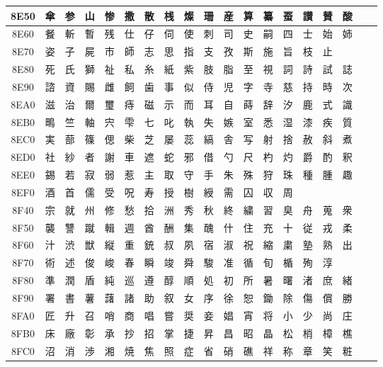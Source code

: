 \begin{table}[H]
\begin{tabular}{|Sc|*{16}{>{\centering\arraybackslash}p{1em}|}>{\centering\arraybackslash}p{2.5em}|}
8E50 & 傘 & 参 & 山 & 惨 & 撒 & 散 & 桟 & 燦 & 珊 & 産 & 算 & 纂 & 蚕 & 讃 & 賛 & 酸 \\ \hline
8E60 & 餐 & 斬 & 暫 & 残 & 仕 & 仔 & 伺 & 使 & 刺 & 司 & 史 & 嗣 & 四 & 士 & 始 & 姉 \\ \hline
8E70 & 姿 & 子 & 屍 & 市 & 師 & 志 & 思 & 指 & 支 & 孜 & 斯 & 施 & 旨 & 枝 & 止 & \\ \hline
8E80 & 死 & 氏 & 獅 & 祉 & 私 & 糸 & 紙 & 紫 & 肢 & 脂 & 至 & 視 & 詞 & 詩 & 試 & 誌 \\ \hline
8E90 & 諮 & 資 & 賜 & 雌 & 飼 & 歯 & 事 & 似 & 侍 & 児 & 字 & 寺 & 慈 & 持 & 時 & 次 \\ \hline
8EA0 & 滋 & 治 & 爾 & 璽 & 痔 & 磁 & 示 & 而 & 耳 & 自 & 蒔 & 辞 & 汐 & 鹿 & 式 & 識 \\ \hline
8EB0 & 鴫 & 竺 & 軸 & 宍 & 雫 & 七 & 叱 & 執 & 失 & 嫉 & 室 & 悉 & 湿 & 漆 & 疾 & 質 \\ \hline
8EC0 & 実 & 蔀 & 篠 & 偲 & 柴 & 芝 & 屡 & 蕊 & 縞 & 舎 & 写 & 射 & 捨 & 赦 & 斜 & 煮 \\ \hline
8ED0 & 社 & 紗 & 者 & 謝 & 車 & 遮 & 蛇 & 邪 & 借 & 勺 & 尺 & 杓 & 灼 & 爵 & 酌 & 釈 \\ \hline
8EE0 & 錫 & 若 & 寂 & 弱 & 惹 & 主 & 取 & 守 & 手 & 朱 & 殊 & 狩 & 珠 & 種 & 腫 & 趣 \\ \hline
8EF0 & 酒 & 首 & 儒 & 受 & 呪 & 寿 & 授 & 樹 & 綬 & 需 & 囚 & 収 & 周 &   &   &   \\ \hline
8F40 & 宗 & 就 & 州 & 修 & 愁 & 拾 & 洲 & 秀 & 秋 & 終 & 繍 & 習 & 臭 & 舟 & 蒐 & 衆 \\ \hline
8F50 & 襲 & 讐 & 蹴 & 輯 & 週 & 酋 & 酬 & 集 & 醜 & 什 & 住 & 充 & 十 & 従 & 戎 & 柔 \\ \hline
8F60 & 汁 & 渋 & 獣 & 縦 & 重 & 銃 & 叔 & 夙 & 宿 & 淑 & 祝 & 縮 & 粛 & 塾 & 熟 & 出 \\ \hline
8F70 & 術 & 述 & 俊 & 峻 & 春 & 瞬 & 竣 & 舜 & 駿 & 准 & 循 & 旬 & 楯 & 殉 & 淳 & \\ \hline
8F80 & 準 & 潤 & 盾 & 純 & 巡 & 遵 & 醇 & 順 & 処 & 初 & 所 & 暑 & 曙 & 渚 & 庶 & 緒 \\ \hline
8F90 & 署 & 書 & 薯 & 藷 & 諸 & 助 & 叙 & 女 & 序 & 徐 & 恕 & 鋤 & 除 & 傷 & 償 & 勝 \\ \hline
8FA0 & 匠 & 升 & 召 & 哨 & 商 & 唱 & 嘗 & 奨 & 妾 & 娼 & 宵 & 将 & 小 & 少 & 尚 & 庄 \\ \hline
8FB0 & 床 & 廠 & 彰 & 承 & 抄 & 招 & 掌 & 捷 & 昇 & 昌 & 昭 & 晶 & 松 & 梢 & 樟 & 樵 \\ \hline
8FC0 & 沼 & 消 & 渉 & 湘 & 焼 & 焦 & 照 & 症 & 省 & 硝 & 礁 & 祥 & 称 & 章 & 笑 & 粧 \\ \hline

\end{tabular}
\end{table}
